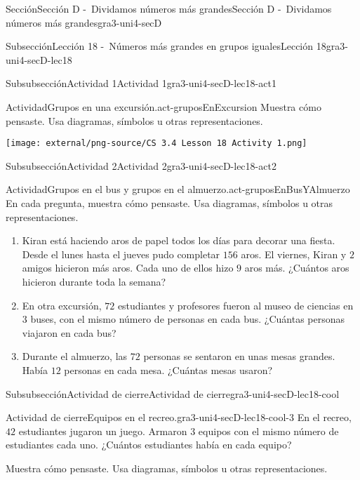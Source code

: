 \documentclass[twoside,14pt,]{extarticle}
\begin{document}
\begin{sectionptx}{Sección}{Sección D -~Dividamos números más grandes}{}{Sección D -~Dividamos números más grandes}{}{}{gra3-uni4-secD}
\begin{subsectionptx}{Subsección}{Lección 18 -~Números más grandes en grupos iguales}{}{Lección 18}{}{}{gra3-uni4-secD-lec18}
\begin{subsubsectionptx}{Subsubsección}{Actividad 1}{}{Actividad 1}{}{}{gra3-uni4-secD-lec18-act1}
\begin{activity}{Actividad}{Grupos en una excursión.}{act-gruposEnExcursion}
Muestra cómo pensaste. Usa diagramas, símbolos u otras representaciones.%
\begin{image}{0.15}{0.7}{0.15}{}%
\texttt{[image: external/png-source/CS 3.4 Lesson 18 Activity 1.png]}
\end{image}%
\end{activity}%
\end{subsubsectionptx}
%
%
\typeout{************************************************}
\typeout{************************************************}
%
\begin{subsubsectionptx}{Subsubsección}{Actividad 2}{}{Actividad 2}{}{}{gra3-uni4-secD-lec18-act2}
\begin{activity}{Actividad}{Grupos en el bus y grupos en el almuerzo.}{act-gruposEnBusYAlmuerzo}%
En cada pregunta, muestra cómo pensaste. Usa diagramas, símbolos u otras representaciones.%
%
\begin{enumerate}
\item{}Kiran está haciendo aros de papel todos los días para decorar una fiesta. Desde el lunes hasta el jueves pudo completar \(156\) aros. El viernes, Kiran y \(2\) amigos hicieron más aros. Cada uno de ellos hizo \(9\) aros más. ¿Cuántos aros hicieron durante toda la semana?%
\item{}En otra excursión, \(72\) estudiantes y profesores fueron al museo de ciencias en \(3\) buses, con el mismo número de personas en cada bus. ¿Cuántas personas viajaron en cada bus?%
\item{}Durante el almuerzo, las \(72\) personas se sentaron en unas mesas grandes. Había \(12\) personas en cada mesa. ¿Cuántas mesas usaron?%
\end{enumerate}
\end{activity}%
\end{subsubsectionptx}
%
%
\typeout{************************************************}
\typeout{************************************************}
%
\begin{subsubsectionptx}{Subsubsección}{Actividad de cierre}{}{Actividad de cierre}{}{}{gra3-uni4-secD-lec18-cool}
\begin{project}{Actividad de cierre}{Equipos en el recreo.}{gra3-uni4-secD-lec18-cool-3}%
En el recreo, \(42\) estudiantes jugaron un juego. Armaron \(3\) equipos con el mismo número de estudiantes cada uno. ¿Cuántos estudiantes había en cada equipo?%
\par
Muestra cómo pensaste. Usa diagramas, símbolos u otras representaciones.%

\end{project}
\end{subsubsectionptx}
\end{subsectionptx}
\end{sectionptx}
\end{document}
